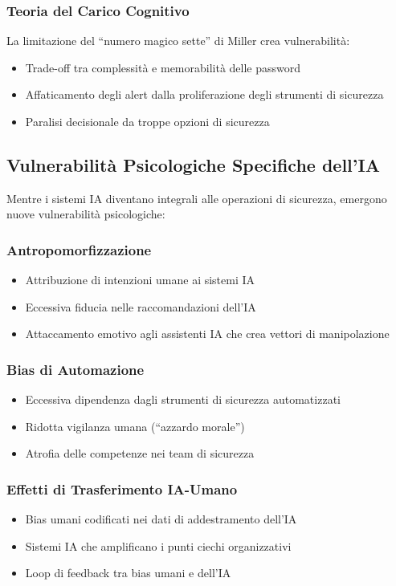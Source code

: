 \documentclass[11pt,a4paper]{article}
\begin{document}
\subsubsection{Teoria del Carico Cognitivo}

La limitazione del ``numero magico sette'' di Miller\cite{miller1956} crea vulnerabilità:
\begin{itemize}
\item Trade-off tra complessità e memorabilità delle password
\item Affaticamento degli alert dalla proliferazione degli strumenti di sicurezza
\item Paralisi decisionale da troppe opzioni di sicurezza
\end{itemize}

\subsection{Vulnerabilità Psicologiche Specifiche dell'IA}

Mentre i sistemi IA diventano integrali alle operazioni di sicurezza, emergono nuove vulnerabilità psicologiche:

\subsubsection{Antropomorfizzazione}
\begin{itemize}
\item Attribuzione di intenzioni umane ai sistemi IA
\item Eccessiva fiducia nelle raccomandazioni dell'IA
\item Attaccamento emotivo agli assistenti IA che crea vettori di manipolazione
\end{itemize}

\subsubsection{Bias di Automazione}
\begin{itemize}
\item Eccessiva dipendenza dagli strumenti di sicurezza automatizzati
\item Ridotta vigilanza umana (``azzardo morale'')
\item Atrofia delle competenze nei team di sicurezza
\end{itemize}

\subsubsection{Effetti di Trasferimento IA-Umano}
\begin{itemize}
\item Bias umani codificati nei dati di addestramento dell'IA
\item Sistemi IA che amplificano i punti ciechi organizzativi
\item Loop di feedback tra bias umani e dell'IA
\end{itemize}
\end{document}
